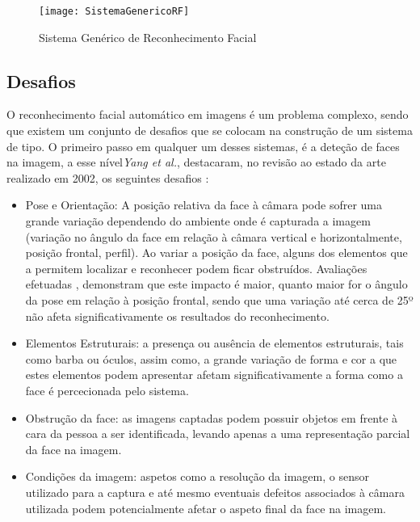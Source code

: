 \begin{figure}[ht]
  \begin{center}
    \leavevmode
    \texttt{[image: SistemaGenericoRF]}
    \caption{Sistema Genérico de Reconhecimento Facial}
    \label{fig:genericRF}
  \end{center}
\end{figure}

\subsection{Desafios} \label{desafios}
O reconhecimento facial automático em imagens é um problema complexo, sendo que existem um conjunto de desafios que se colocam na construção de um sistema de tipo. O primeiro passo em qualquer um desses sistemas, é a deteção de faces na imagem, a esse nível\textit{Yang et al.}, destacaram, no revisão ao estado da arte realizado em 2002,  os seguintes desafios \citep{Yang2002}:
\begin{itemize}
\item Pose e Orientação: A posição relativa da face à câmara pode sofrer uma grande variação dependendo do ambiente onde é capturada a imagem (variação no ângulo da face em relação à câmara vertical e horizontalmente, posição frontal, perfil). Ao variar a posição da face, alguns dos elementos que a permitem localizar e reconhecer podem ficar obstruídos. Avaliações efetuadas \citep{BlackburnDuaneM.;BoneMike;Phillips2001}, demonstram que este impacto é maior, quanto maior for o ângulo da pose em relação à posição frontal, sendo que uma variação até cerca de 25º não afeta significativamente os resultados do reconhecimento.
\item  Elementos Estruturais: a presença ou ausência de elementos estruturais, tais como barba ou óculos, assim como, a grande variação de forma e cor a que estes elementos podem apresentar afetam significativamente a forma como a face é percecionada pelo sistema.
\item Obstrução da face: as imagens captadas podem possuir objetos em frente à cara da pessoa a ser identificada, levando apenas a uma representação parcial da face na imagem.
\item Condições da imagem: aspetos como a resolução da imagem, o sensor utilizado para a captura e até mesmo eventuais defeitos associados à câmara utilizada podem potencialmente afetar o aspeto final da face na imagem.
\end{itemize}

